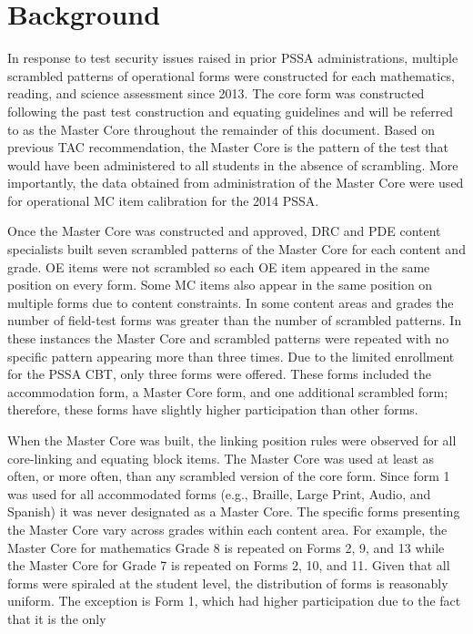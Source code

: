 \documentclass[11pt]{article}
\begin{document}
\section{Background}
\par
In response to test security issues raised in prior PSSA
administrations, multiple scrambled patterns of operational forms were
constructed for each mathematics, reading, and science assessment
since 2013. The core form was constructed following the past test
construction and equating guidelines and will be referred to as the
Master Core throughout the remainder of this document. Based on
previous TAC recommendation, the Master Core is the pattern of the
test that would have been administered to all students in the absence
of scrambling. More importantly, the data obtained from administration
of the Master Core were used for operational MC item calibration for
the 2014 PSSA.
\par
Once the Master Core was constructed and approved, DRC and PDE content
specialists built seven scrambled patterns of the Master Core for each
content and grade. OE items were not scrambled so each OE item
appeared in the same position on every form. Some MC items also appear
in the same position on multiple forms due to content constraints. In
some content areas and grades the number of field-test forms was
greater than the number of scrambled patterns. In these instances the
Master Core and scrambled patterns were repeated with no specific
pattern appearing more than three times. Due to the limited enrollment
for the PSSA CBT, only three forms were offered. These forms included
the accommodation form, a Master Core form, and one additional
scrambled form; therefore, these forms have slightly higher
participation than other forms.
\par
When the Master Core was built, the linking position rules were
observed for all core-linking and equating block items. The Master
Core was used at least as often, or more often, than any scrambled
version of the core form. Since form 1 was used for all accommodated
forms (e.g., Braille, Large Print, Audio, and Spanish) it was never
designated as a Master Core. The specific forms presenting the Master
Core vary across grades within each content area. For example, the
Master Core for mathematics Grade 8 is repeated on Forms 2, 9, and 13
while the Master Core for Grade 7 is repeated on Forms 2, 10, and
11. Given that all forms were spiraled at the student level, the
distribution of forms is reasonably uniform. The exception is Form 1,
which had higher participation due to the fact that it is the only
\end{document}
